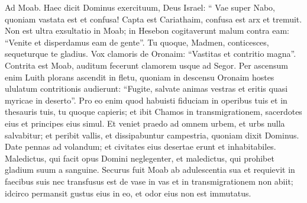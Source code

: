 \begin{biblechapter}
\begin{biblechapter}
\begin{biblechapter}
\begin{biblechapter}
\begin{biblechapter}
\begin{biblechapter}
\begin{biblechapter}
\begin{biblechapter}
\begin{biblechapter}
\begin{biblechapter}
\begin{biblechapter}
\begin{biblechapter}
\begin{biblechapter}
\begin{biblechapter}
\begin{biblechapter}
\begin{biblechapter}
\begin{biblechapter}
\begin{biblechapter}
\begin{biblechapter}
\begin{biblechapter}
\begin{biblechapter}
\begin{biblechapter}
\begin{biblechapter}
\begin{biblechapter}
\begin{biblechapter}
\begin{biblechapter}
\begin{biblechapter}
\begin{biblechapter}
\begin{biblechapter}
\begin{biblechapter}
\begin{biblechapter}
\begin{biblechapter}
\begin{biblechapter}
\begin{biblechapter}
\begin{biblechapter}
\begin{biblechapter}
\begin{biblechapter}
\begin{biblechapter}
\begin{biblechapter}
\begin{biblechapter}
\begin{biblechapter}
\begin{biblechapter}
\begin{biblechapter}
\begin{biblechapter}
\begin{biblechapter}
\begin{biblechapter}
\begin{biblechapter}
\begin{biblechapter}
\verse Ad Moab.
 Haec dicit Dominus exercituum, Deus Israel:
 “ Vae super Nabo, quoniam vastata est et confusa!
 Capta est Cariathaim, confusa est arx et tremuit.
 \verse Non est ultra exsultatio in Moab;
 in Hesebon cogitaverunt malum contra eam:
 “Venite et disperdamus eam de gente”.
 Tu quoque, Madmen, conticesces, sequeturque te gladius.
 \verse Vox clamoris de Oronaim:
 “Vastitas et contritio magna”.
 \verse Contrita est Moab,
 auditum fecerunt clamorem usque ad Segor.
 \verse Per ascensum enim Luith
 plorans ascendit in fletu,
 quoniam in descensu Oronaim
 hostes ululatum contritionis audierunt:
 \verse “Fugite, salvate animas vestras
 et eritis quasi myricae in deserto”.
 \verse Pro eo enim quod habuisti fiduciam
 in operibus tuis et in thesauris tuis,
 tu quoque capieris;
 et ibit Chamos in transmigrationem,
 sacerdotes eius et principes eius simul.
 \verse Et veniet praedo ad omnem urbem, et urbs nulla salvabitur;
 et peribit vallis, et dissipabuntur campestria,
 quoniam dixit Dominus.
 \verse Date pennas ad volandum;
 et civitates eius desertae erunt et inhabitabiles.
 \verse Maledictus, qui facit opus Domini neglegenter,
 et maledictus, qui prohibet gladium suum a sanguine.
 \verse Securus fuit Moab ab adulescentia sua
 et requievit in faecibus suis
 nec transfusus est de vase in vas
 et in transmigrationem non abiit;
 idcirco permansit gustus eius in eo,
 et odor eius non est immutatus.

\end{biblechapter}
\end{biblechapter}
\end{biblechapter}
\end{biblechapter}
\end{biblechapter}
\end{biblechapter}
\end{biblechapter}
\end{biblechapter}
\end{biblechapter}
\end{biblechapter}
\end{biblechapter}
\end{biblechapter}
\end{biblechapter}
\end{biblechapter}
\end{biblechapter}
\end{biblechapter}
\end{biblechapter}
\end{biblechapter}
\end{biblechapter}
\end{biblechapter}
\end{biblechapter}
\end{biblechapter}
\end{biblechapter}
\end{biblechapter}
\end{biblechapter}
\end{biblechapter}
\end{biblechapter}
\end{biblechapter}
\end{biblechapter}
\end{biblechapter}
\end{biblechapter}
\end{biblechapter}
\end{biblechapter}
\end{biblechapter}
\end{biblechapter}
\end{biblechapter}
\end{biblechapter}
\end{biblechapter}
\end{biblechapter}
\end{biblechapter}
\end{biblechapter}
\end{biblechapter}
\end{biblechapter}
\end{biblechapter}
\end{biblechapter}
\end{biblechapter}
\end{biblechapter}
\end{biblechapter}
